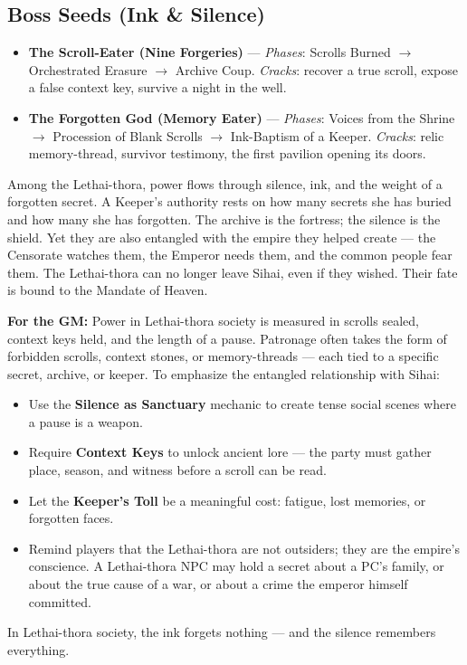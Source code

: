 \subsection*{Boss Seeds (Ink \& Silence)}
\begin{itemize}
\item \textbf{The Scroll-Eater (Nine Forgeries)} --- \textit{Phases}: Scrolls Burned \(\rightarrow\) Orchestrated Erasure \(\rightarrow\) Archive Coup. \textit{Cracks}: recover a true scroll, expose a false context key, survive a night in the well.
\item \textbf{The Forgotten God (Memory Eater)} --- \textit{Phases}: Voices from the Shrine \(\rightarrow\) Procession of Blank Scrolls \(\rightarrow\) Ink-Baptism of a Keeper. \textit{Cracks}: relic memory-thread, survivor testimony, the first pavilion opening its doors.
\end{itemize}

\begin{tcolorbox}[colback=black!3,colframe=black!40!white,title={Patronage \& Power},breakable]
Among the Lethai-thora, power flows through silence, ink, and the weight of a forgotten secret. A Keeper's authority rests on how many secrets she has buried and how many she has forgotten. The archive is the fortress; the silence is the shield. Yet they are also entangled with the empire they helped create --- the Censorate watches them, the Emperor needs them, and the common people fear them. The Lethai-thora can no longer leave Sihai, even if they wished. Their fate is bound to the Mandate of Heaven.

\textbf{For the GM:}  
Power in Lethai-thora society is measured in scrolls sealed, context keys held, and the length of a pause. Patronage often takes the form of forbidden scrolls, context stones, or memory-threads --- each tied to a specific secret, archive, or keeper. To emphasize the entangled relationship with Sihai:
\begin{itemize}
\item Use the \textbf{Silence as Sanctuary} mechanic to create tense social scenes where a pause is a weapon.
\item Require \textbf{Context Keys} to unlock ancient lore --- the party must gather place, season, and witness before a scroll can be read.
\item Let the \textbf{Keeper's Toll} be a meaningful cost: fatigue, lost memories, or forgotten faces.
\item Remind players that the Lethai-thora are not outsiders; they are the empire's conscience. A Lethai-thora NPC may hold a secret about a PC's family, or about the true cause of a war, or about a crime the emperor himself committed.
\end{itemize}
In Lethai-thora society, the ink forgets nothing --- and the silence remembers everything.
\end{tcolorbox}

